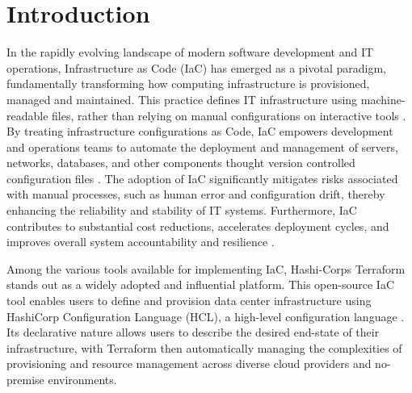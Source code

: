 \section{Introduction}
\label{sec:introduction}

In the rapidly evolving landscape of modern software development and IT operations, Infrastructure as Code (IaC) has emerged as a pivotal paradigm, fundamentally transforming how computing infrastructure is provisioned, managed and maintained. This practice defines IT infrastructure using machine-readable files, rather than relying on manual configurations on interactive tools \cite{aws_iac}. By treating infrastructure configurations as Code, IaC empowers development and operations teams to automate the deployment and management of servers, networks, databases, and other components thought version controlled configuration files \cite{chef_iac}. The adoption of IaC significantly mitigates risks associated with manual processes, such as human error and configuration drift, thereby enhancing the reliability and stability of IT systems. Furthermore, IaC contributes to substantial cost reductions, accelerates deployment cycles, and improves overall system accountability and resilience \cite{ali_iac_principles_2021, redhat_iac_2025, roper_iac_bestpractices_2025}. 

Among the various tools available for implementing IaC, Hashi-Corps Terraform stands out as a widely adopted and influential platform. This open-source IaC tool enables users to define and provision data center infrastructure using HashiCorp Configuration Language (HCL), a high-level configuration language \cite{hashicorp_terraform_iac_2025}. Its declarative nature allows users to describe the desired end-state of their infrastructure, with Terraform then automatically managing the complexities of provisioning and resource management across diverse cloud providers and no-premise environments.

